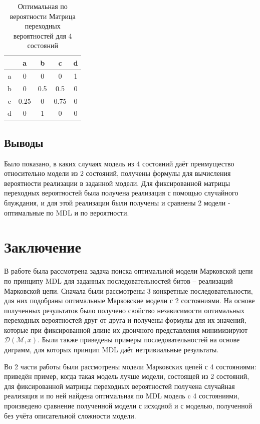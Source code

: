 \documentclass[12pt]{article}
\begin{document}
	\begin{table}[!h]
		\caption{Оптимальная по вероятности Матрица переходных вероятностей для 4 состояний}
		\label{table:matrix4p}
		\begin{center}
			\begin{tabular}{|c|c|c|c|c|}
				\hline
				& a & b & c & d \\
				\hline
				a & 0 & 0 & 0 & 1\\
				\hline
				b & 0 & 0.5 & 0.5 & 0 \\
				\hline
				c & 0.25 & 0 & 0.75 & 0 \\
				\hline
				d & 0 & 1 & 0 & 0 \\
				\hline
			\end{tabular}
		\end{center}
	\end{table}
	
	\subsection*{Выводы}
	Было показано, в каких случаях модель из 4 состояний даёт преимущество относительно модели из 2 состояний, получены формулы для вычисления вероятности реализации в заданной модели. Для фиксированной матрицы переходных вероятностей была получена реализация с помощью случайного блуждания, и для этой реализации были получены и сравнены 2 модели - оптимальные по MDL и по вероятности.
	
	\section{Заключение}
	В работе была рассмотрена задача поиска оптимальной модели Марковской цепи по принципу MDL для заданных последовательностей битов -- реализаций Марковской цепи. Сначала были рассмотрены 3 конкретные последовательности, для них подобраны оптимальные Марковские модели с 2 состояниями. На основе полученных результатов было получено свойство независимости оптимальных переходных вероятностей друг от друга и получены формулы для их значений, которые при фиксированной длине их двоичного представления минимизируют $\mathcal{D}(\mathcal{M},x)$. Были также приведены примеры последовательностей на основе диграмм, для которых принцип MDL даёт нетривиальные результаты.
	
	Во 2 части работы были рассмотрены модели Марковских цепей с 4 состояниями: приведён пример, когда такая модель лучше модели, состоящей из 2 состояний, для фиксированной матрицы переходных вероятностей получена случайная реализация и по ней найдена оптимальная по MDL модель c 4 состояниями, произведено сравнение полученной модели с исходной и с моделью, полученной без учёта описательной сложности модели.
	
\end{document}
